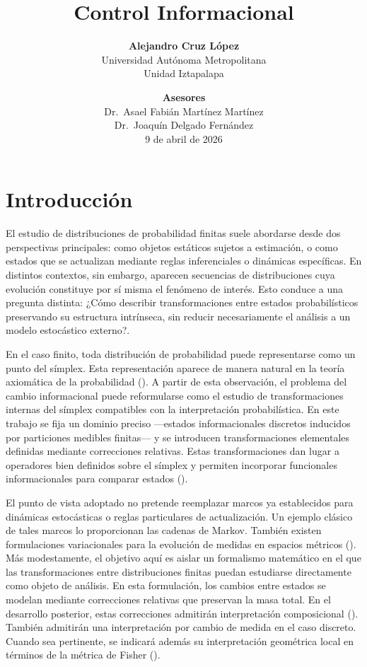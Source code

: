 \documentclass[12pt]{article}
\title{Control Informacional}
\author{
\textbf{Alejandro Cruz López} \\
Universidad Autónoma Metropolitana \\
Unidad Iztapalapa
}
\date{
\vspace{1em}
\textbf{Asesores} \\[0.3em]
Dr.\ Asael Fabián Martínez Martínez \\
Dr.\ Joaquín Delgado Fernández \\
\vspace{1em}
9 de abril de 2026
}
\begin{document}
\maketitle
\section*{Introducción}

El estudio de distribuciones de probabilidad finitas suele abordarse desde dos perspectivas principales: como objetos estáticos sujetos a estimación, o como estados que se actualizan mediante reglas inferenciales o dinámicas específicas. En distintos contextos, sin embargo, aparecen secuencias de distribuciones cuya evolución constituye por sí misma el fenómeno de interés. Esto conduce a una pregunta distinta: ¿Cómo describir transformaciones entre estados probabilísticos preservando su estructura intrínseca, sin reducir necesariamente el análisis a un modelo estocástico externo?.

En el caso finito, toda distribución de probabilidad puede representarse como un punto del símplex. Esta representación aparece de manera natural en la teoría axiomática de la probabilidad (\cite{Kolmogorov1933}). A partir de esta observación, el problema del cambio informacional puede reformularse como el estudio de transformaciones internas del símplex compatibles con la interpretación probabilística. En este trabajo se fija un dominio preciso ---estados informacionales discretos inducidos por particiones medibles finitas--- y se introducen transformaciones elementales definidas mediante correcciones relativas. Estas transformaciones dan lugar a operadores bien definidos sobre el símplex y permiten incorporar funcionales informacionales para comparar estados (\cite{Csiszar1975}).

El punto de vista adoptado no pretende reemplazar marcos ya establecidos para dinámicas estocásticas o reglas particulares de actualización. Un ejemplo clásico de tales marcos lo proporcionan las cadenas de Markov. También existen formulaciones variacionales para la evolución de medidas en espacios métricos (\cite{JordanKinderlehrerOtto1998}). Más modestamente, el objetivo aquí es aislar un formalismo matemático en el que las transformaciones entre distribuciones finitas puedan estudiarse directamente como objeto de análisis. En esta formulación, los cambios entre estados se modelan mediante correcciones relativas que preservan la masa total. En el desarrollo posterior, estas correcciones admitirán interpretación composicional (\cite{Aitchison1986}). También admitirán una interpretación por cambio de medida en el caso discreto. Cuando sea pertinente, se indicará además su interpretación geométrica local en términos de la métrica de Fisher (\cite{Amari2016}).
\end{document}
